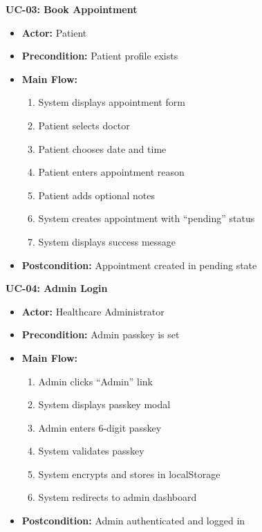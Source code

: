 \documentclass[11pt,a4paper]{article}
\begin{document}
\textbf{UC-03: Book Appointment}
\begin{itemize}
    \item \textbf{Actor:} Patient
    \item \textbf{Precondition:} Patient profile exists
    \item \textbf{Main Flow:}
    \begin{enumerate}
        \item System displays appointment form
        \item Patient selects doctor
        \item Patient chooses date and time
        \item Patient enters appointment reason
        \item Patient adds optional notes
        \item System creates appointment with ``pending'' status
        \item System displays success message
    \end{enumerate}
    \item \textbf{Postcondition:} Appointment created in pending state
\end{itemize}

\textbf{UC-04: Admin Login}
\begin{itemize}
    \item \textbf{Actor:} Healthcare Administrator
    \item \textbf{Precondition:} Admin passkey is set
    \item \textbf{Main Flow:}
    \begin{enumerate}
        \item Admin clicks ``Admin'' link
        \item System displays passkey modal
        \item Admin enters 6-digit passkey
        \item System validates passkey
        \item System encrypts and stores in localStorage
        \item System redirects to admin dashboard
    \end{enumerate}
    \item \textbf{Postcondition:} Admin authenticated and logged in
\end{itemize}
\end{document}
